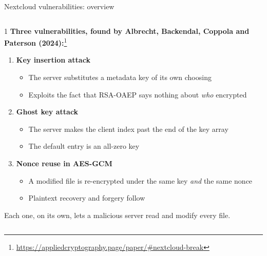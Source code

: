\ifdefined\PRESENTATION\else\PassOptionsToClass{handout}{beamer}\fi\documentclass[aspectratio=169, lualatex]{beamer}
\begin{document}
\begin{frame}{Nextcloud vulnerabilities: overview}
	\begin{columns}[c]
		\begin{column}{1\textwidth}
			\textbf{Three vulnerabilities, found by Albrecht, Backendal, Coppola and Paterson (2024):}\footnote{\url{https://appliedcryptography.page/paper/\#nextcloud-break}}
			\begin{enumerate}
				\item \textbf{Key insertion attack}
				      \begin{itemize}
					      \item The server substitutes a metadata key of its own choosing
					      \item Exploits the fact that RSA-OAEP says nothing about \textit{who} encrypted
				      \end{itemize}
				\item \textbf{Ghost key attack}
				      \begin{itemize}
					      \item The server makes the client index past the end of the key array
					      \item The default entry is an all-zero key
				      \end{itemize}
				\item \textbf{Nonce reuse in AES-GCM}
				      \begin{itemize}
					      \item A modified file is re-encrypted under the same key \textit{and} the same nonce
					      \item Plaintext recovery and forgery follow
				      \end{itemize}
			\end{enumerate}
			\vspace{0.2cm}
			Each one, on its own, lets a malicious server read and modify every file.
		\end{column}
	\end{columns}
\end{frame}
\end{document}
